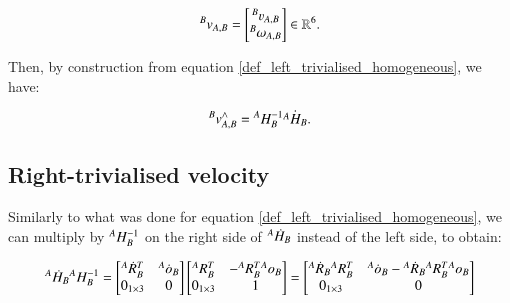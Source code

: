 \begin{equation}\label{def_left_trivialised_velocity}
    \leftsuperscript{B}{v}{A,B} = \begin{bmatrix}
        \leftsuperscript{B}{\varv}{A,B} \\
        \leftsuperscript{B}{\omega}{A,B}
    \end{bmatrix}
    \in \mathbb{R}^6.
\end{equation}

Then, by construction from equation \ref{def_left_trivialised_homogeneous}, we have:

\begin{equation} \label{left_trivialised_construction}
    {}^{B}{v}_{A,B}^{\wedge} = {}^{A}{H}_{B}^{-1} \dot{{}^{A}{H}_{B}}.
\end{equation}

\subsection{Right-trivialised velocity}

Similarly to what was done for equation \ref{def_left_trivialised_homogeneous}, we can multiply by ${}^{A}{H}_{B}^{-1}$ on the right side of ${}^{A}{\dot{H}}_{B}$ instead of the left side, to obtain:

\begin{equation}\label{def_right_trivialised_homogeneous}
    {}^{A}{\dot{H}}_{B} {}^{A}{H}_{B}^{-1} = 
    \begin{bmatrix}
        {}^{A}{\dot{R}}_{B}^{T} & {}^{A}{\dot{o}}_{B} \\
        0_{1\times 3} & 0
    \end{bmatrix}
    \begin{bmatrix}
        {}^{A}{R}_{B}^{T} & -{}^{A}{R}_{B}^T {}^{A}{o}_{B} \\
        0_{1\times 3} & 1
    \end{bmatrix}
    = 
    \begin{bmatrix}
        {}^{A}{\dot{R}}_{B}{}^{A}{R}_{B}^{T} & {}^{A}{\dot{o}}_{B} - {}^{A}{\dot{R}}_{B}{}^{A}{R}_{B}^T{}^{A}{o}_{B} \\
        0_{1\times 3} & 0
    \end{bmatrix}
\end{equation}

